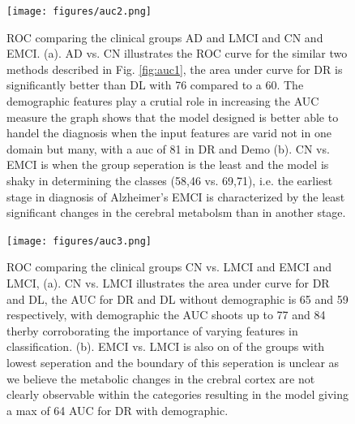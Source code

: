 \documentclass[authoryear,preprint,revi	ew,12pt]{elsarticle}
\newcommand{\Fig}[1]  {Fig. \ref{fig:#1}}
\newcommand{\Alz} {{Alzheimer\textquoteright s} }
\begin{document}
\begin{figure}
	\centering
	\texttt{[image: figures/auc2.png]}
	\caption{ROC comparing the clinical groups AD and LMCI and CN and EMCI. (a). AD vs. CN illustrates the ROC curve for the similar two methods described in \Fig{auc1}, the area under curve for DR is significantly better than DL with 76 compared to a 60. The demographic features play a crutial role in increasing the AUC measure the graph shows that the model designed is better able to handel the diagnosis when the input features are varid not in one domain but many, with a auc of 81 in DR and Demo (b). CN vs. EMCI is when the group seperation is the least and the model is shaky in determining the classes (58,46 vs. 69,71), i.e. the earliest stage in diagnosis of \Alz EMCI is characterized by the least significant changes in the cerebral metabolsm than in another stage.}
	\label{fig:auc2}
\end{figure}

\begin{figure}
	\centering
	\texttt{[image: figures/auc3.png]}
	\caption{ROC comparing the clinical groups CN vs. LMCI and EMCI and LMCI, (a). CN vs. LMCI illustrates the area under curve for DR and DL, the AUC for DR and DL without demographic is 65 and 59 respectively, with demographic the AUC shoots up to 77 and 84 therby corroborating the importance of varying features in classification. (b). EMCI vs. LMCI is also on of the groups with lowest seperation and the boundary of this seperation is unclear as we believe the metabolic changes in the crebral cortex are not clearly observable within the categories resulting in the model giving a max of 64 AUC for DR with demographic.}
	\label{fig:auc3}
\end{figure}
\end{document}
